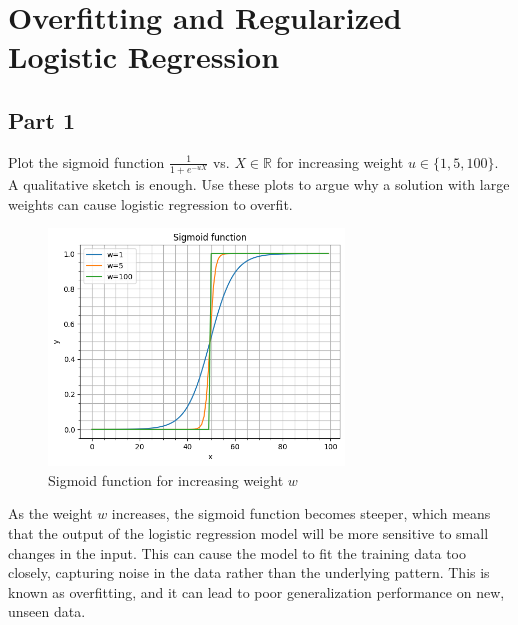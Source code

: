 \section{Overfitting and Regularized Logistic Regression}

\subsection{Part 1}
Plot the sigmoid function $\frac{1}{1 + e^{-uX}}$ vs. $X \in \mathbb{R}$ for increasing weight $u \in \{1, 5, 100\}$. A qualitative sketch is enough. Use these plots to argue why a solution with large weights can cause logistic regression to overfit.
\begin{qsolve}
	\begin{qsolve}[]
		\begin{figure}[H]
			\centering
			\includegraphics[width=0.7\textwidth]{sigmoid.png}
			\caption{Sigmoid function for increasing weight $w$}
		\end{figure}
		As the weight $w$ increases, the sigmoid function becomes steeper, which means that the output of the logistic regression model will be more sensitive to small changes in the input. This can cause the model to fit the training data too closely, capturing noise in the data rather than the underlying pattern. This is known as overfitting, and it can lead to poor generalization performance on new, unseen data.
	\end{qsolve}
\end{qsolve}
